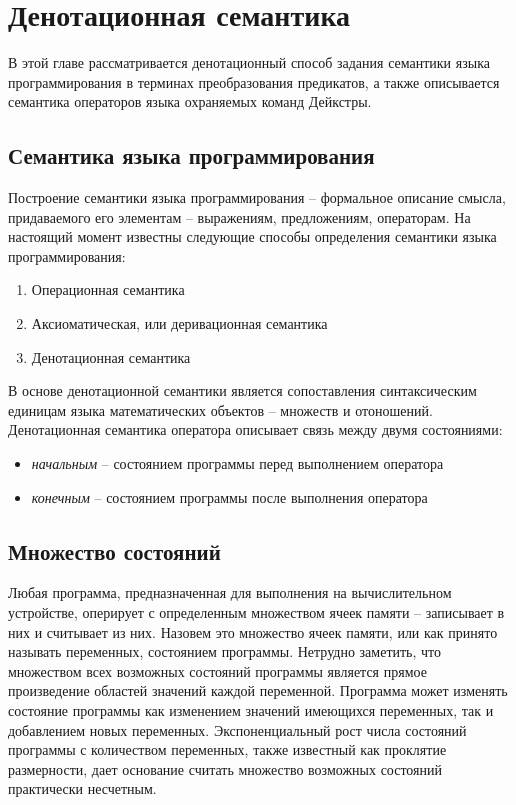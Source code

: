 \chapter{Денотационная семантика} \label{ch1}

В этой главе рассматривается денотационный способ задания семантики 
языка программирования в терминах преобразования предикатов,
а также описывается семантика операторов языка охраняемых команд Дейкстры.

\section{Семантика языка программирования}
Построение семантики языка программирования -- формальное описание смысла, придаваемого его
элементам -- выражениям, предложениям, операторам. На настоящий момент известны
следующие способы определения семантики языка программирования:
\begin{enumerate}
	\item Операционная семантика
	\item Аксиоматическая, или деривационная семантика
	\item Денотационная семантика
\end{enumerate}


В основе денотационной семантики является сопоставления синтаксическим единицам языка
математических объектов -- множеств и отоношений. Денотационная семантика оператора 
описывает связь между двумя состояниями: 
\begin{itemize}
	\item \textit{начальным} -- состоянием программы перед выполнением оператора
	\item \textit{конечным} -- состоянием программы после выполнения оператора
\end{itemize}

\section{Множество состояний}
Любая программа, предназначенная для выполнения на вычислительном устройстве, оперирует
с определенным множеством ячеек памяти -- записывает в них и считывает из них. Назовем это множество
ячеек памяти, или как принято называть переменных, состоянием программы. Нетрудно заметить,
что множеством всех возможных состояний программы является прямое произведение областей значений
каждой переменной. Программа может изменять состояние программы как изменением значений
имеющихся переменных, так и добавлением новых переменных. Экспоненциальный рост числа состояний 
программы с количеством переменных, также известный как проклятие размерности, дает основание 
считать множество возможных состояний практически несчетным.

